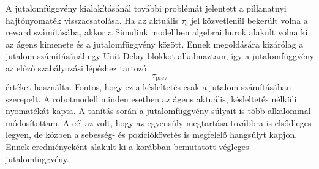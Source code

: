 \documentclass[12pt,a4paper]{report}
\begin{document}
	A jutalomfüggvény kialakításánál további problémát jelentett a pillanatnyi hajtónyomaték visszacsatolása. Ha az aktuális $\tau_c$ jel közvetlenül bekerült volna a reward számításába, akkor a Simulink modellben algebrai hurok alakult volna ki az ágens kimenete és a jutalomfüggvény között.
	\newline
	\newline
	Ennek megoldására kizárólag a jutalom számításánál egy Unit Delay blokkot alkalmaztam, így a jutalomfüggvény az előző szabályozási lépéshez tartozó
	\begin{equation}
		\tau_{\mathrm{prev}}
	\end{equation}
	értéket használta. Fontos, hogy ez a késleltetés csak a jutalom számításában szerepelt. A robotmodell minden esetben az ágens aktuális, késleltetés nélküli nyomatékát kapta.
	\newline
	\newline
	A tanítás során a jutalomfüggvény súlyait is több alkalommal módosítottam. A cél az volt, hogy az egyensúly megtartása továbbra is elsődleges legyen, de közben a sebesség- és pozíciókövetés is megfelelő hangsúlyt kapjon. Ennek eredményeként alakult ki a korábban bemutatott végleges jutalomfüggvény.
	
\end{document}
